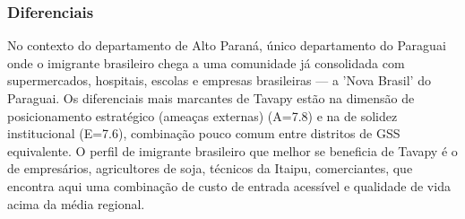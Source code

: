 \subsubsection*{Diferenciais}\label{dif-tavapy-1021}
No contexto do departamento de Alto Paraná, único departamento do Paraguai onde o imigrante brasileiro chega a uma comunidade já consolidada com supermercados, hospitais, escolas e empresas brasileiras — a 'Nova Brasil' do Paraguai. Os diferenciais mais marcantes de Tavapy estão na dimensão de posicionamento estratégico (ameaças externas) (A=7.8) e na de solidez institucional (E=7.6), combinação pouco comum entre distritos de GSS equivalente. O perfil de imigrante brasileiro que melhor se beneficia de Tavapy é o de empresários, agricultores de soja, técnicos da Itaipu, comerciantes, que encontra aqui uma combinação de custo de entrada acessível e qualidade de vida acima da média regional.
